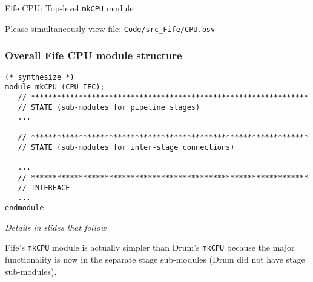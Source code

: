 \begin{frame}[fragile]

\begin{center}
  {\LARGE Fife CPU: Top-level {\tt mkCPU} module}

  \vspace{10ex}

  Please simultaneously view file: \hm \verb|Code/src_Fife/CPU.bsv|
\end{center}

\end{frame}


\begin{frame}[fragile]
\frametitle{Overall Fife CPU module structure}

\footnotesize

\begin{minipage}{0.725\textwidth}
\begin{Verbatim}[frame=single, label=From src\_Drum/CPU.bsv]
(* synthesize *)
module mkCPU (CPU_IFC);
   // ****************************************************************
   // STATE (sub-modules for pipeline stages)
   ...

   // ****************************************************************
   // STATE (sub-modules for inter-stage connections)

   ...
   // ****************************************************************
   // INTERFACE
   ...
endmodule
\end{Verbatim}
\end{minipage}
\hm
\emph{Details in slides that follow}

\vspace{5ex}

Fife's {\tt mkCPU} module is actually simpler than Drum's {\tt mkCPU}
because the major functionality is now in the separate stage
sub-modules (Drum did not have stage sub-modules).

\end{frame}


